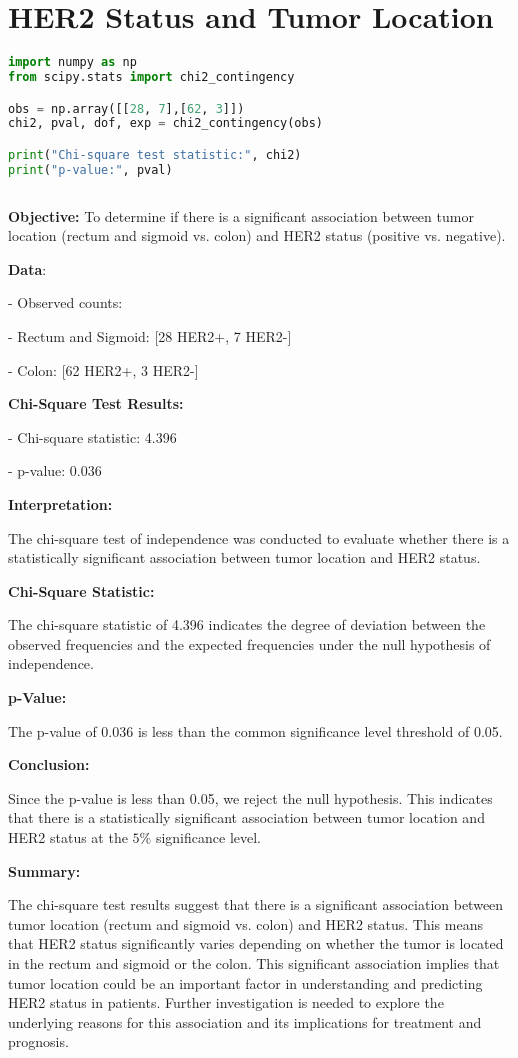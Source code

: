 \documentclass[12 px]{article}
\begin{document}
\section*{HER2 Status and Tumor Location}

\begin{lstlisting}[language=Python, breaklines=true]
import numpy as np
from scipy.stats import chi2_contingency

obs = np.array([[28, 7],[62, 3]])
chi2, pval, dof, exp = chi2_contingency(obs)

print("Chi-square test statistic:", chi2)
print("p-value:", pval)
      
\end{lstlisting}

\textbf{Objective:} To determine if there is a significant association between tumor location (rectum and sigmoid vs. colon) and HER2 status (positive vs. negative).

          
\textbf{Data}:

- Observed counts:

  - Rectum and Sigmoid: [28 HER2+, 7 HER2-]
  
  - Colon: [62 HER2+, 3 HER2-]
  

\textbf{Chi-Square Test Results:}

- Chi-square statistic: 4.396

- p-value: 0.036


\textbf{Interpretation:}

The chi-square test of independence was conducted to evaluate whether there is a 
statistically significant association between tumor location and HER2 status.


\textbf{Chi-Square Statistic:}

The chi-square statistic of 4.396 indicates the degree of deviation between the observed
frequencies and the expected frequencies under the null hypothesis of independence.

\textbf{p-Value:}
 
The p-value of 0.036 is less than the common significance level threshold of 0.05.


\textbf{Conclusion:}

Since the p-value is less than 0.05, we reject the null hypothesis. 
This indicates that there is a statistically significant association between 
tumor location and HER2 status at the $5\%$ significance level.
            
\textbf{Summary:}

The chi-square test results suggest that there is a significant association between tumor
location (rectum and sigmoid vs. colon) and HER2 status. This means that HER2 status
significantly varies depending on whether the tumor is located in the rectum and 
sigmoid or the colon. This significant association implies that tumor location 
could be an important factor in understanding and predicting HER2 status in patients. 
Further investigation is needed to explore the underlying reasons for this 
association and its implications for treatment and prognosis.
\end{document}
